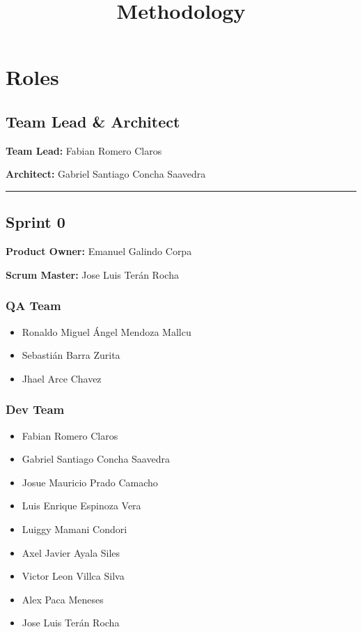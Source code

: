\documentclass{article}
\title{Methodology}
\author{}
\date{}
\providecommand{\tightlist}{
  \setlength{\itemsep}{0pt}\setlength{\parskip}{0pt}}
\begin{document}
\maketitle

\hypertarget{roles}{
\section{Roles}\label{roles}}

\hypertarget{teamleadarchitect}{
\subsection{Team Lead \& Architect}\label{teamleadarchitect}}

\textbf{Team Lead:}
Fabian Romero Claros

\textbf{Architect:}
Gabriel Santiago Concha Saavedra

\begin{center}\rule{0.5\linewidth}{0.5pt}\end{center}

\hypertarget{sprint0}{
\subsection{Sprint 0}\label{sprint0}}

\textbf{Product Owner:}
Emanuel Galindo Corpa 

\textbf{Scrum Master: }
Jose Luis Terán Rocha

\hypertarget{qateam}{
\subsubsection{QA Team}\label{qateam-0}}

\begin{itemize}
\tightlist
\item
  Ronaldo Miguel Ángel Mendoza Mallcu
\item
  Sebastián Barra Zurita
\item
  Jhael Arce Chavez
\end{itemize}

\hypertarget{devteam}{
\subsubsection{Dev Team}\label{devteam-0}}

\begin{itemize}
\tightlist
\item
  Fabian Romero Claros
\item
  Gabriel Santiago Concha Saavedra
\item
  Josue Mauricio Prado Camacho
\item
  Luis Enrique Espinoza Vera
\item
  Luiggy Mamani Condori
\item
  Axel Javier Ayala Siles
\item
  Victor Leon Villca Silva
\item
  Alex Paca Meneses
\item
  Jose Luis Terán Rocha
\end{itemize}
\end{document}
